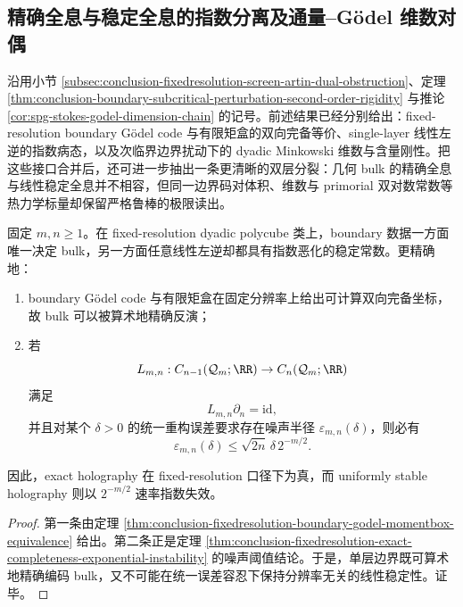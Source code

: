 \subsection{精确全息与稳定全息的指数分离及通量--Gödel 维数对偶}\label{subsec:conclusion-exact-stable-holography-flux-godel-duality}

沿用小节 \ref{subsec:conclusion-fixedresolution-screen-artin-dual-obstruction}、定理 \ref{thm:conclusion-boundary-subcritical-perturbation-second-order-rigidity} 与推论 \ref{cor:spg-stokes-godel-dimension-chain} 的记号。前述结果已经分别给出：fixed-resolution boundary Gödel code 与有限矩盒的双向完备等价、single-layer 线性左逆的指数病态，以及次临界边界扰动下的 dyadic Minkowski 维数与含量刚性。把这些接口合并后，还可进一步抽出一条更清晰的双层分裂：几何 bulk 的精确全息与线性稳定全息并不相容，但同一边界码对体积、维数与 primorial 双对数常数等热力学标量却保留严格鲁棒的极限读出。

\begin{theorem}[精确全息与稳定全息的指数分离]\label{thm:conclusion-exact-vs-stable-holography-exponential-separation}
固定 \(m,n\ge 1\)。在 fixed-resolution dyadic polycube 类上，boundary 数据一方面唯一决定 bulk，另一方面任意线性左逆却都具有指数恶化的稳定常数。更精确地：
\begin{enumerate}
  \item boundary Gödel code 与有限矩盒在固定分辨率上给出可计算双向完备坐标，故 bulk 可以被算术地精确反演；
  \item 若
  \[
  L_{m,n}:C_{n-1}(\mathcal Q_m;\RR)\to C_n(\mathcal Q_m;\RR)
  \]
  满足
  \[
  L_{m,n}\partial_n=\mathrm{id},
  \]
  并且对某个 \(\delta>0\) 的统一重构误差要求存在噪声半径 \(\varepsilon_{m,n}(\delta)\)，则必有
  \[
  \varepsilon_{m,n}(\delta)\le \sqrt{2n}\,\delta\,2^{-m/2}.
  \]
\end{enumerate}
因此，exact holography 在 fixed-resolution 口径下为真，而 uniformly stable holography 则以 \(2^{-m/2}\) 速率指数失效。
\end{theorem}
\begin{proof}
第一条由定理 \ref{thm:conclusion-fixedresolution-boundary-godel-momentbox-equivalence} 给出。第二条正是定理 \ref{thm:conclusion-fixedresolution-exact-completeness-exponential-instability} 的噪声阈值结论。于是，单层边界既可算术地精确编码 bulk，又不可能在统一误差容忍下保持分辨率无关的线性稳定性。证毕。
\end{proof}

